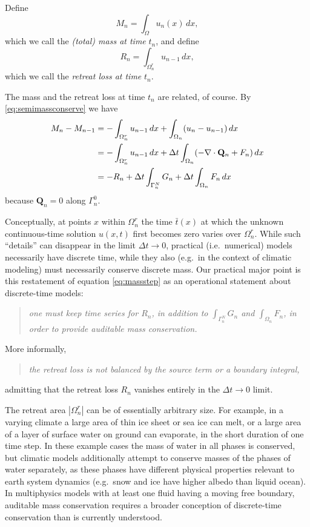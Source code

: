 \documentclass[final,leqno,onefignum,onetabnum]{siamltex1213bueler}
\newcommand\bQ{\mathbf{Q}}
\newcommand{\Div}{\nabla\cdot}
\begin{document}
Define
\begin{equation}
M_n = \int_\Omega u_n(x)\,dx,
\end{equation}
which we call the \emph{(total) mass at time} $t_n$, and define
\begin{equation}
R_n = \int_{\Omega_n^r} u_{n-1}\,dx,
\end{equation}
which we call the \emph{retreat loss at time} $t_n$.

The mass and the retreat loss at time $t_n$ are related, of course.  By \eqref{eq:semimassconserve} we have
\begin{align}
M_n - M_{n-1} &=  - \int_{\Omega_n^r} u_{n-1}\,dx + \int_{\Omega_n} (u_n - u_{n-1})\,dx \label{eq:massstep} \\
   &= - \int_{\Omega_n^r} u_{n-1}\,dx + \Delta t \int_{\Omega_n} (- \Div \bQ_n + F_n) \,dx \notag \\
   &= - R_n + \Delta t \int_{\Gamma_n^N} G_n + \Delta t \int_{\Omega_n} F_n\,dx \notag
\end{align}
because $\bQ_n=0$ along $\Gamma_n^0$.

Conceptually, at points $x$ within $\Omega_n^r$ the time $\bar t(x)$ at which the unknown continuous-time solution $u(x,t)$ first becomes zero varies over $\Omega_n^r$.  While such ``details'' can disappear in the limit $\Delta t \to 0$, practical (i.e.~numerical) models necessarily have discrete time, while they also (e.g.~in the context of climatic modeling) must necessarily conserve discrete mass.  Our practical major point is this restatement of equation \eqref{eq:massstep} as an operational statement about discrete-time models:
\begin{quote}
\emph{one must keep time series for $R_n$, in addition to $\int_{\Gamma_n^N} G_n$ and $\int_{\Omega_n} F_n$, in order to provide auditable mass conservation.}
\end{quote}
More informally,
\begin{quote}
\emph{the retreat loss is not balanced by the source term or a boundary integral,}
\end{quote}
admitting that the retreat loss $R_n$ vanishes entirely in the $\Delta t\to 0$ limit.

The retreat area $|\Omega_n^r|$ can be of essentially arbitrary size.  For example, in a varying climate a large area of thin ice sheet or sea ice can melt, or a large area of a layer of surface water on ground can evaporate, in the short duration of one time step.  In these example cases the mass of water in all phases is conserved, but climatic models additionally attempt to conserve masses of the phases of water separately, as these phases have different physical properties relevant to earth system dynamics (e.g.~snow and ice have higher albedo than liquid ocean).  In multiphysics models with at least one fluid having a moving free boundary, auditable mass conservation requires a broader conception of discrete-time conservation than is currently understood.
\end{document}
